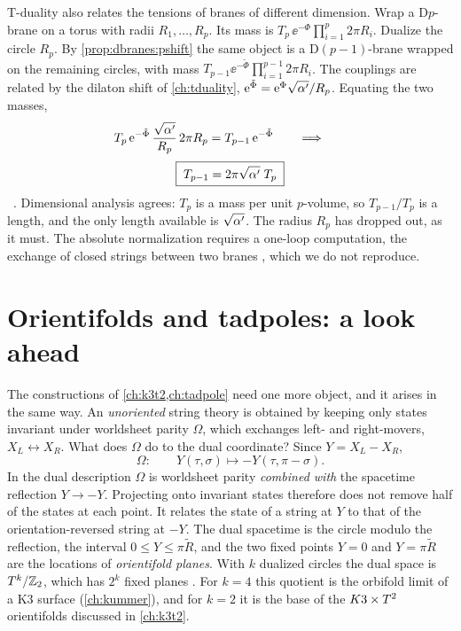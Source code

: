 T-duality also relates the tensions of branes of different dimension. Wrap a D$p$-brane on a
torus with radii $R_1,\dots,R_p$. Its mass is $T_p\,\ee^{-\Phi}\prod_{i=1}^p2\pi R_i$. Dualize the
circle $R_p$. By \cref{prop:dbranes:pshift} the same object is a D$(p-1)$-brane wrapped on the
remaining circles, with mass $T_{p-1}\ee^{-\tilde\Phi}\prod_{i=1}^{p-1}2\pi R_i$. The couplings are
related by the dilaton shift of \cref{ch:tduality},
$\mathrm{e}^{\tilde\Phi}=\mathrm{e}^{\Phi}\sqrt{\alpha'}/R_p$. Equating the two masses,
\[
 T_p\,\mathrm{e}^{-\tilde\Phi}\,\frac{\sqrt{\alpha'}}{R_p}\,2\pi R_p=T_{p-1}\,\mathrm{e}^{-\tilde\Phi}
 \qquad\Longrightarrow\qquad
\]
\begin{equation}\label{eq:dbranes:recursion}
 \boxed{\;T_{p-1}=2\pi\sqrt{\alpha'}\;T_p\;}
\end{equation}
\TL\ . Dimensional analysis agrees: $T_p$ is a
mass per unit $p$-volume, so $T_{p-1}/T_p$ is a length, and the only length available is
$\sqrt{\alpha'}$. The radius $R_p$ has dropped out, as it must. The absolute normalization requires a one-loop computation, the
exchange of closed strings between two branes , which we do not
reproduce.

\section{Orientifolds and tadpoles: a look ahead}\label{sec:dbranes:orientifold}

The constructions of \cref{ch:k3t2,ch:tadpole} need one more object, and it arises in the same
way. An \emph{unoriented} string theory is obtained by keeping only states invariant under
worldsheet parity $\Omega$, which exchanges left- and right-movers, $X_L\leftrightarrow X_R$.
What does $\Omega$ do to the dual coordinate? Since $Y=X_L-X_R$,
\begin{equation}\label{eq:dbranes:omega}
 \Omega:\qquad Y(\tau,\sigma)\longmapsto-Y(\tau,\pi-\sigma) .
\end{equation}
In the dual description $\Omega$ is worldsheet parity \emph{combined with} the spacetime
reflection $Y\to-Y$. Projecting onto invariant states therefore does not remove half of the
states at each point. It relates the state of a string at $Y$ to that of the orientation-reversed
string at $-Y$. The dual spacetime is the circle modulo the reflection, the interval
$0\le Y\le\pi\tilde R$, and the two fixed points $Y=0$ and $Y=\pi\tilde R$ are the locations of
\emph{orientifold planes}. With $k$ dualized circles the dual space is
$T^k/\mathbb{Z}_2$, which has $2^k$ fixed planes . For $k=4$ this
quotient is the orbifold limit of a K3 surface (\cref{ch:kummer}), and for $k=2$ it is the base of
the $K3\times T^2$ orientifolds discussed in \cref{ch:k3t2}.

